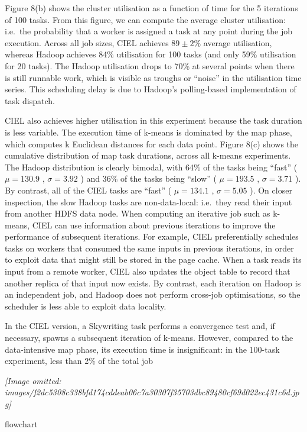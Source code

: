 \documentclass[
]{article}
\begin{document}
Figure 8(b) shows the cluster utilisation as a function of time for the
5 iterations of 100 tasks. From this figure, we can compute the average
cluster utilisation: i.e.~the probability that a worker is assigned a
task at any point during the job execution. Across all job sizes, CIEL
achieves \(89 \pm 2\%\) average utilisation, whereas Hadoop achieves
84\% utilisation for 100 tasks (and only 59\% utilisation for 20 tasks).
The Hadoop utilisation drops to 70\% at several points when there is
still runnable work, which is visible as troughs or ``noise'' in the
utilisation time series. This scheduling delay is due to Hadoop's
polling-based implementation of task dispatch.

CIEL also achieves higher utilisation in this experiment because the
task duration is less variable. The execution time of k-means is
dominated by the map phase, which computes k Euclidean distances for
each data point. Figure 8(c) shows the cumulative distribution of map
task durations, across all k-means experiments. The Hadoop distribution
is clearly bimodal, with 64\% of the tasks being ``fast'' (
\(\mu = 130.9\) , \(\sigma = 3.92\) ) and 36\% of the tasks being
``slow'' ( \(\mu = 193.5\) , \(\sigma = 3.71\) ). By contrast, all of
the CIEL tasks are ``fast'' ( \(\mu = 134.1\) , \(\sigma = 5.05\) ). On
closer inspection, the slow Hadoop tasks are non-data-local: i.e.~they
read their input from another HDFS data node. When computing an
iterative job such as k-means, CIEL can use information about previous
iterations to improve the performance of subsequent iterations. For
example, CIEL preferentially schedules tasks on workers that consumed
the same inputs in previous iterations, in order to exploit data that
might still be stored in the page cache. When a task reads its input
from a remote worker, CIEL also updates the object table to record that
another replica of that input now exists. By contrast, each iteration on
Hadoop is an independent job, and Hadoop does not perform cross-job
optimisations, so the scheduler is less able to exploit data locality.

In the CIEL version, a Skywriting task performs a convergence test and,
if necessary, spawns a subsequent iteration of k-means. However,
compared to the data-intensive map phase, its execution time is
insignificant: in the 100-task experiment, less than 2\% of the total
job

\textit{[Image omitted: images/f2dc5308c338bfd174cddeab06c7a30307f35703dbc89480cf69d022ec431c6d.jpg]}

flowchart
\end{document}
